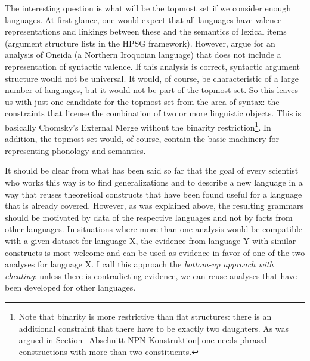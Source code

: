 The interesting question is what will be the topmost set if we consider enough languages. At
first glance, one would expect that all languages have valence representations and linkings between
these and the semantics of lexical items (argument structure lists in the HPSG framework). However,
\citet{KM2012a} argue for an analysis of Oneida (a Northern Iroquoian language) that does not
include a representation of syntactic valence. If this analysis is correct, syntactic argument
structure would not be universal. It would, of course, be characteristic of a large number of
languages, but it would not be part of the topmost set. So this leaves us with just one candidate
for the topmost set from the area of syntax: the constraints that license the combination of two or more linguistic
objects. This is basically Chomsky's External Merge without the binarity restriction\footnote{%
  Note that binarity is more restrictive than flat structures: there is an additional constraint
  that there have to be exactly two daughters. As was argued in Section~\ref{Abschnitt-NPN-Konstruktion} one needs phrasal
  constructions with more than two constituents.
}. In addition, the topmost set would, of course, contain the basic machinery for representing phonology and semantics.  


It should be clear from what has been said so far that the goal of every scientist who works this
way is to find generalizations and to describe a new language in a way that reuses theoretical constructs
that have been found useful for a language that is already covered. However, as was explained above,
the resulting grammars should be motivated by data of the respective languages and not by facts from
other languages. In situations where more than one analysis would be compatible with a given dataset
for language X, the evidence from language Y with similar constructs is most welcome and can be used
as evidence in favor of one of the two analyses for language X. I call this approach the
\emph{bottom-up approach with cheating}: unless there is contradicting evidence, we can reuse
analyses that have been developed for other languages.  

